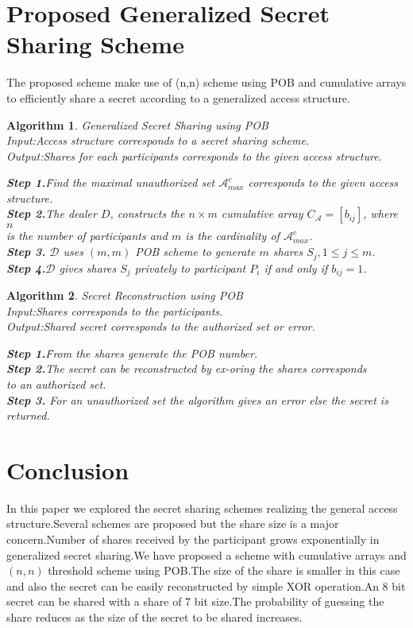 \documentclass{llncs}
\newtheorem{algorithm}{Algorithm}
\begin{document}
\section{Proposed Generalized Secret Sharing Scheme}
The proposed scheme make use of (n,n) scheme using POB and cumulative arrays to  efficiently share a secret according to a generalized access structure.
\begin{algorithm}{Generalized Secret Sharing using POB}\\
Input:Access structure corresponds to a secret sharing scheme.\\
Output:Shares for each  participants corresponds to the given access structure.\\
\begin{tabbing}
\textbf{Step 1.}\=Find the maximal unauthorized set 		$\mathcal{A}^{c}_{max}$ 
				corresponds to the given access structure.\\
\textbf{Step 2.}\>The dealer $D$, constructs the $n \times m$ cumulative array $C_{\mathcal{A}}=[b_{ij}]$,   where $n$ \\
\>is the number of participants and $m$ is the cardinality of $\mathcal{A}_{max}^c$. \\         
\textbf{Step 3.}\>  $\mathcal{D}$ uses $(m,m)$ POB scheme  to generate $m$ shares $S_j,1 \le j \le m$.\\
\textbf{Step 4.}$\mathcal{D}$ gives shares $S_j$ privately to participant $P_i$ if and only if $b_{ij}=1$.    
\end{tabbing}
\end{algorithm}
\begin{algorithm}{Secret Reconstruction using POB}\\
Input:Shares corresponds to the participants.\\
Output:Shared secret corresponds to the authorized set or error.\\
\begin{tabbing}
\textbf{Step 1.}\=From the shares generate the POB number.\\
\textbf{Step 2.}\>The secret can be reconstructed by  ex-oring the shares corresponds\\
\> to an authorized set.\\  
\textbf{Step 3.}\>  For an unauthorized set the algorithm gives an error else the secret is returned.\\
\end{tabbing}
\end{algorithm}
\section{Conclusion}
In this paper we explored the secret sharing schemes realizing the general access structure.Several schemes are proposed but the share size is a major concern.Number of shares received by the participant grows exponentially in generalized secret sharing.We have proposed a scheme with cumulative arrays and $(n,n)$ threshold scheme using POB.The size of the share is smaller in this case and also the secret can be easily reconstructed by simple XOR operation.An 8 bit secret can be shared with a share of 7 bit size.The probability of guessing the share reduces as the size of the secret to be shared increases.


\end{document}
